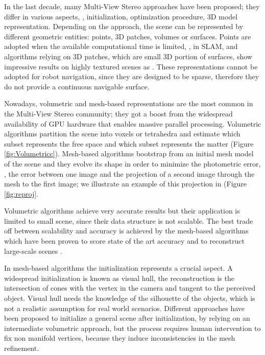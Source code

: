 In the last decade, many Multi-View Stereo approaches have been proposed; they differ in various aspects, \eg, initialization, optimization procedure, 3D model representation.
Depending on the approach, the scene can be represented by different geometric entities: points, 3D patches, volumes or surfaces.
Points are adopted when the available computational time is limited, \eg, in SLAM, and algorithms relying on 3D patches, which are small 3D portion of surfaces,  show impressive results on highly textured scenes as \cite{furukawa2009reconstructing}. 
These representations cannot be adopted for robot navigation, since they are designed to be sparse, therefore they do not provide a continuous navigable surface.

Nowadays, volumetric and mesh-based representations are the most common in the Multi-View Stereo community; they got a boost from the widespread availability of GPU hardware that enables massive parallel processing.
Volumetric algorithms partition the scene into voxels or tetrahedra and estimate which subset represents the free space and which subset represents the matter (Figure \ref{fig:Volumetricc}).
Mesh-based algorithms bootstrap from an initial mesh model of the scene and they evolve its shape in order to minimize the photometric error, \ie, the error between one image and the projection of a second image through the mesh to the first image; we illustrate an example of this projection in (Figure \ref{fig:reproj}.

Volumetric algorithms achieve very accurate results but their application is limited to small scene, since their data structure is not scalable. 
The best trade off between scalability and accuracy is achieved by the mesh-based algorithms which have been proven to score state of the art accuracy \cite{li2015detail} and to reconstruct large-scale scenes \cite{vu_et_al_2012}.

In mesh-based algorithms the initialization represents a crucial aspect.
A widespread initialization is known as visual hull, the reconstruction is the intersection of cones with the vertex in the camera and tangent to the perceived object.
Visual hull needs the knowledge of the silhouette of the objects, which is not a realistic assumption for real world scenarios.
Different approaches have been proposed to initialize a general scene after initialization, by relying on an intermediate volumetric approach, but the process requires human intervention to fix non manifold vertices, because they induce inconsistencies in the mesh refinement.

